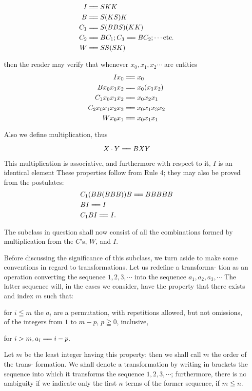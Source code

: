 \documentclass[9pt, twoside]{extarticle}
\newcommand{\td}[2][] {\todo[tickmarkheight=3pt, inline, size=\tiny, #1]{#2}}
\newcommand\longeq{=\joinrel=}
\begin{document}
\begin{align*}
  I &\longeq SKK \\
  B &\longeq S(KS)K \\
  C_1 &\longeq S(BBS)(KK) \\
  C_2 &\longeq BC_1; C_3 \longeq BC_2; \cdots \text{etc.} \\
  W &\longeq SS(SK)
\end{align*}

then the reader may verify that whenever \(x_0, x_1, x_2 \cdots\) are entities
\begin{align*}
  Ix_0 &\longeq x_0 \\
  Bx_0x_1x_2 &\longeq x_0(x_1x_2) \\
  C_1x_0x_1x_2 &\longeq x_0x_2x_1 \\
  C_2x_0x_1x_2x_3 &\longeq x_0x_1x_3x_2 \\
  Wx_0x_1 &\longeq x_0x_1x_1
\end{align*}  \td{hrule of dots}

Also we define multiplication, thus

\[X\cdot Y \longeq BXY\]

This multiplication is associative, and furthermore with respect to it, \(I\) is an
identical element These properties follow from Rule 4; they may also be
proved from the postulates:
\begin{align*}
  &C_1(BB(BBB))B \longeq BBBBB \\
  &BI \longeq I \\
  &C_1BI \longeq I. \\
\end{align*}

The subclass in question shall now consist of all the combinations formed by multiplication from the \(C\)'s, \(W\), and \(I\).

Before discussing the significance of this subclass, we turn aside to make
some conventions in regard to transformations. Let us redefine a transforma-
tion as an operation converting the sequence \(1, 2, 3, \cdots\) into the sequence
\(a_1, a_2, a_3, \cdots\) The latter sequence will, in the cases we consider, have the
property that there exists and index \(m\) such that:
\begin{enumerate*}[label=\arabic*)]
\item for \(i \leqq m\) the \(a_i\) are a
  permutation, with repetitions allowed, but not omissions, of the integers from
  \(1\) to \(m - p\), \(p \geqq 0\)\td{long minus sign}, inclusive, \item for \(i > m, a_i \longeq i - p\). \end{enumerate*} Let \(m\) be the least
integer having this property; then we shall call \(m\) the order of the trans-
formation. We shall denote a transformation by writing in brackets the
sequence into which it transforms the sequence \(1, 2, 3, \cdots\); furthermore,
there is no ambiguity if we indicate only the first \(n\) terms of the former
sequence, if \(m \leqq n\).
\end{document}
